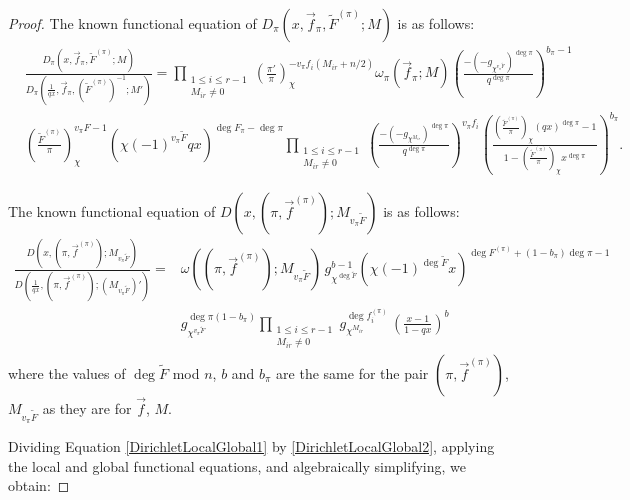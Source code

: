 \documentclass[11pt,letterpaper]{article}
\theoremstyle{definition}
\theoremstyle{remark}
\numberwithin{equation}{section}
\theoremstyle{dotless}
\newcommand{\res}[2]{\left(\frac{#1}{#2}\right)}
\renewcommand{\tilde}{\widetilde}
\begin{document}
\begin{proof}
The known functional equation of $D_{\pi}(x, \vec{f}_{\pi}, \tilde{F}^{(\pi)}; M)$ is as follows: 
\begin{equation*}
\begin{split}
&\frac{D_{\pi}(x, \vec{f}_{\pi}, \tilde{F}^{(\pi)}; M)}{D_{\pi}\left(\frac{1}{qx}, \vec{f}_{\pi}, (\tilde{F}^{(\pi)})^{-1}; M'\right) } = \prod_{\substack{1 \leq i \leq r-1 \\ M_{ir} \neq 0}} \res{\pi'}{\pi}_{\chi}^{-v_\pi f_i(M_{ir}+n/2)} \omega_\pi(\vec{f}_\pi; M) \left(\frac{-(-g_{\chi^{v_{\pi} \tilde{F}}})^{\deg \pi}}{q^{\deg\pi}}\right)^{b_{\pi}-1}  \\
& \res{\tilde{F}^{(\pi)}}{\pi}_\chi^{v_\pi F-1} (\chi(-1)^{v_\pi\tilde{F}}qx)^{\deg F_\pi-\deg \pi}  \prod_{\substack{1 \leq i \leq r-1 \\ M_{ir} \neq 0}} \left(\frac{-(-g_{\chi^{M_{ir}}})^{\deg \pi}}{q^{\deg \pi}}\right)^{v_\pi f_i} \left( \frac{\res{\tilde{F}^{(\pi)}}{\pi}_\chi(qx)^{\deg \pi}-1}{1-\res{\tilde{F}^{(\pi)}}{\pi}_\chi x^{\deg \pi}}\right)^{b_{\pi}}.
\end{split}
\end{equation*}

The known functional equation of $D(x, (\pi, \vec{f}^{(\pi)}); M_{v_\pi \tilde{F}})$ is as follows:
\begin{equation*}
\begin{split}
\frac{D(x, (\pi, \vec{f}^{(\pi)}); M_{v_\pi \tilde{F}})}{D\left( \frac{1}{qx}, \left(\pi, \vec{f}^{(\pi)}\right); (M_{v_\pi \tilde{F}})'\right)} = & \omega((\pi, \vec{f}^{(\pi)}); M_{v_\pi \tilde{F}}) \, g_{\chi^{\deg \tilde{F}}}^{b-1} (\chi(-1)^{\deg \tilde{F}} x)^{\deg F^{(\pi)}+(1-b_\pi)\deg \pi -1} \\
&g_{\chi^{v_\pi \tilde{F}}}^{\deg \pi(1-b_\pi)} \prod_{\substack{1 \leq i \leq r-1 \\ M_{ir} \neq 0}} g_{\chi^{M_{ir}}}^{\deg f_i^{(\pi)}} \, \left( \frac{x-1}{1- qx}\right)^b
\end{split}
\end{equation*}
where the values of $\deg \tilde{F}$ mod $n$, $b$ and $b_\pi$ are the same for the pair $(\pi, \vec{f}^{(\pi)})$, $M_{v_\pi \tilde{F}}$ as they are for $\vec{f}$, $M$. 

Dividing Equation \eqref{DirichletLocalGlobal1} by \eqref{DirichletLocalGlobal2}, applying the local and global functional equations, and algebraically simplifying, we obtain:


\end{proof}
\end{document}
